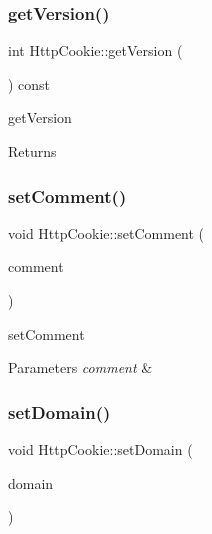 \subsubsection{\texorpdfstring{get\+Version()}{getVersion()}}
{\footnotesize\ttfamily int Http\+Cookie\+::get\+Version (\begin{DoxyParamCaption}{ }\end{DoxyParamCaption}) const}



get\+Version 

\begin{DoxyReturn}{Returns}

\end{DoxyReturn}
\mbox{\label{class_http_cookie_a77e86a49664f147dc359cb9ad8a9013b}} 
\subsubsection{\texorpdfstring{set\+Comment()}{setComment()}}
{\footnotesize\ttfamily void Http\+Cookie\+::set\+Comment (\begin{DoxyParamCaption}\item[{const Q\+Byte\+Array \&}]{comment }\end{DoxyParamCaption})}



set\+Comment 


\begin{DoxyParams}{Parameters}
{\em comment} & \\
\hline
\end{DoxyParams}
\mbox{\label{class_http_cookie_ae4bd49d769fb962399fa1692fe30c8f1}} 
\subsubsection{\texorpdfstring{set\+Domain()}{setDomain()}}
{\footnotesize\ttfamily void Http\+Cookie\+::set\+Domain (\begin{DoxyParamCaption}\item[{const Q\+Byte\+Array \&}]{domain }\end{DoxyParamCaption})}



